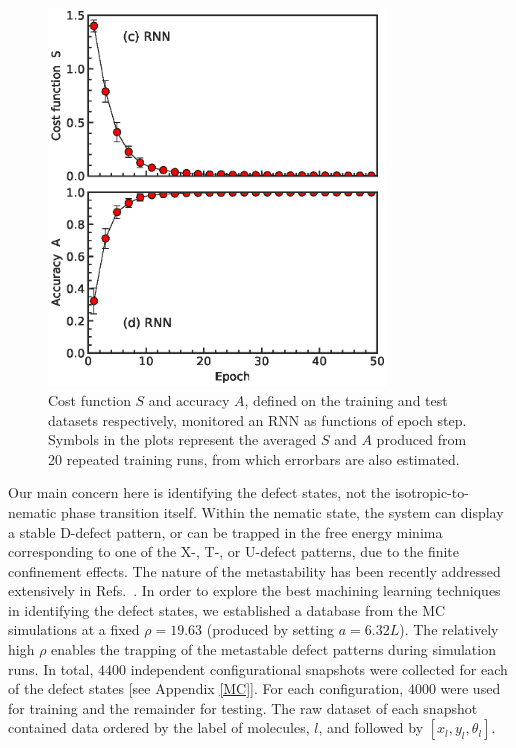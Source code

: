 \begin{figure}
\centering
\includegraphics[width=0.8\textwidth]{./figs/FIG3CD.eps}
\caption{Cost function $S$ and accuracy $A$, defined on the training and test datasets respectively, monitored an RNN as functions of epoch step. Symbols in the plots represent the averaged $S$ and $A$ produced from 20 repeated training runs, from which errorbars are also estimated.
}
\label{rnn_SA}
\end{figure}

Our main concern here is identifying the defect states, not the isotropic-to-nematic phase transition itself.
Within the nematic state, the system can display a stable D-defect pattern, or can be trapped in the free energy minima corresponding to one of the X-, T-, or U-defect patterns, due to the finite confinement effects. The nature of the metastability has been recently addressed extensively in Refs.\ \cite{Galanis2006,Mulder2011,Lewis2014,Cortes2017,Tsakonas2007,Luo2012,chen2013rods,Mulder2015}.
In order to explore the best machining learning techniques in identifying the defect states, we established a database from the MC simulations at a fixed  $\rho=19.63$ (produced by setting $a=6.32L$). The relatively high $\rho$  enables the trapping of the metastable defect patterns during simulation runs. In total, $4400$ independent configurational snapshots were collected for each of the defect states [see Appendix \ref{MC}].
%
For each configuration, $4000$ were used for training and the remainder for testing. The raw dataset of each snapshot contained data ordered by the label of molecules, $l$, and followed by $[x_l,y_l,\theta_l]$.

